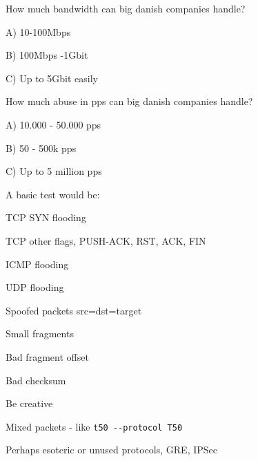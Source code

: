 \documentclass[Screen16to9,17pt]{foils}
\begin{document}
How much bandwidth can big danish companies handle?
\begin{list2}
\item A) 10-100Mbps
\item B) 100Mbps -1Gbit
\item C) Up to 5Gbit easily
\end{list2}

How much abuse in pps can big danish companies handle?
\begin{list2}
\item A) 10.000 - 50.000 pps
\item B) 50 - 500k pps
\item C) Up to 5 million pps
\end{list2}


A basic test would be:
\begin{list2}
\item TCP SYN flooding
\item TCP other flags, PUSH-ACK, RST, ACK, FIN
\item ICMP flooding
\item UDP flooding
\item Spoofed packets src=dst=target \smiley
\item Small fragments
\item Bad fragment offset
\item Bad checksum
\item Be creative
\item Mixed packets - like \verb+t50 --protocol T50+
\item Perhaps esoteric or unused protocols, GRE, IPSec
\end{list2}

\end{document}
